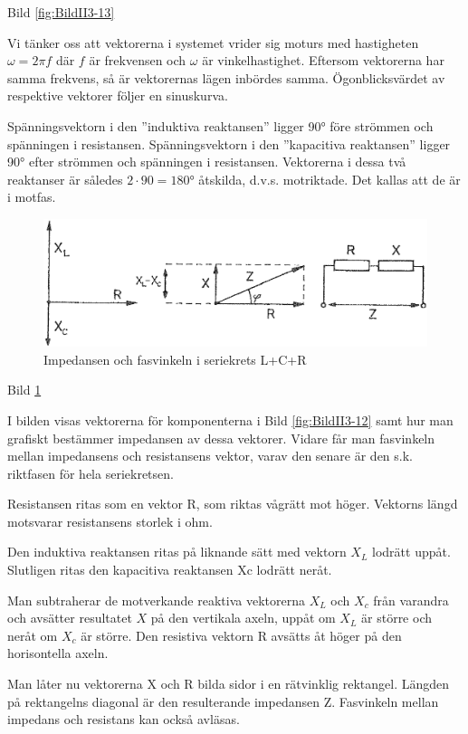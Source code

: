 Bild \ref{fig:BildII3-13}

Vi tänker oss att vektorerna i systemet vrider sig moturs med hastigheten
\(\omega = 2πf\) där \(f\) är frekvensen och \(\omega\) är vinkelhastighet.
Eftersom vektorerna har samma frekvens, så är vektorernas lägen inbördes samma.
Ögonblicksvärdet av respektive vektorer följer en sinuskurva.

Spänningsvektorn i den ''induktiva reaktansen'' ligger 90° före strömmen och
spänningen i resistansen. Spänningsvektorn i den ''kapacitiva reaktansen''
ligger 90° efter strömmen och spänningen i resistansen. Vektorerna i dessa två
reaktanser är således \(2 \cdot 90 = 180°\) åtskilda, d.v.s. motriktade.
Det kallas att de är i motfas.

\begin{figure}
\includegraphics[width=\textwidth]{images/bild_2_3-14.png}
\caption{Impedansen och fasvinkeln i seriekrets L+C+R}
\label{fig:BildII3-14}
\end{figure}

Bild \ref{fig:BildII3-14}

I bilden visas vektorerna för komponenterna i Bild \ref{fig:BildII3-12} samt
hur man grafiskt bestämmer impedansen av dessa vektorer. Vidare får man
fasvinkeln mellan impedansens och resistansens vektor, varav den senare är den
s.k. riktfasen för hela seriekretsen.

Resistansen ritas som en vektor R, som riktas vågrätt mot höger. Vektorns längd
motsvarar resistansens storlek i ohm.

Den induktiva reaktansen ritas på liknande sätt med vektorn \(X_L\) lodrätt
uppåt. Slutligen ritas den kapacitiva reaktansen Xc lodrätt neråt.

Man subtraherar de motverkande reaktiva vektorerna \(X_L\) och \(X_c\) från
varandra och avsätter resultatet \(X\) på den vertikala axeln, uppåt om \(X_L\)
är större och neråt om \(X_c\) är större. Den resistiva vektorn R avsätts åt
höger på den horisontella axeln.

Man låter nu vektorerna X och R bilda sidor i en rätvinklig rektangel. Längden
på rektangelns diagonal är den resulterande impedansen Z. Fasvinkeln mellan
impedans och resistans kan också avläsas.

